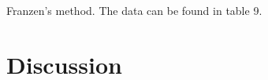 \documentclass{article}
\begin{document}
Franzen’s method. The data can be found in table 9.
\section{Discussion}
\end{document}
